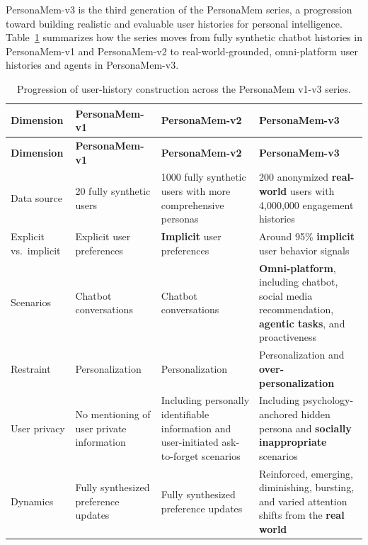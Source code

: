 \documentclass[]{fairmeta}
\begin{document}
PersonaMem-v3 is the third generation of the PersonaMem series, a progression toward building realistic and evaluable user histories for personal intelligence. Table~\ref{table:personamem_progression} summarizes how the series moves from fully synthetic chatbot histories in PersonaMem-v1 and PersonaMem-v2 to real-world-grounded, omni-platform user histories and agents in PersonaMem-v3.

{\footnotesize
\begin{longtable}{p{}p{}p{}p{}}
  \caption{Progression of user-history construction across the PersonaMem v1-v3 series.}
  \label{table:personamem_progression} \\
  \toprule
  \textbf{Dimension} & \textbf{PersonaMem-v1} & \textbf{PersonaMem-v2} & \textbf{PersonaMem-v3} \\
  \midrule
  \endfirsthead

  \toprule
  \textbf{Dimension} & \textbf{PersonaMem-v1} & \textbf{PersonaMem-v2} & \textbf{PersonaMem-v3} \\
  \midrule
  \endhead

  \midrule
  \endfoot

  \bottomrule
  \endlastfoot

  Data source & 20 fully synthetic users & 1000 fully synthetic users with more comprehensive personas & 200 anonymized \textbf{real-world} users with 4,000,000 engagement histories \\[2pt]
  Explicit vs.\ implicit & Explicit user preferences & \textbf{Implicit} user preferences & Around 95\% \textbf{implicit} user behavior signals \\[2pt]
  Scenarios & Chatbot conversations & Chatbot conversations & \textbf{Omni-platform}, including chatbot, social media recommendation, \textbf{agentic tasks}, and proactiveness \\[2pt]
  Restraint & Personalization & Personalization & Personalization and \textbf{over-personalization} \\[2pt]
  User privacy & No mentioning of user private information & Including personally identifiable information and user-initiated ask-to-forget scenarios & Including psychology-anchored hidden persona and \textbf{socially inappropriate} scenarios \\[2pt]
  Dynamics & Fully synthesized preference updates & Fully synthesized preference updates & Reinforced, emerging, diminishing, bursting, and varied attention shifts from the \textbf{real world} \\
\end{longtable}
}
\end{document}
